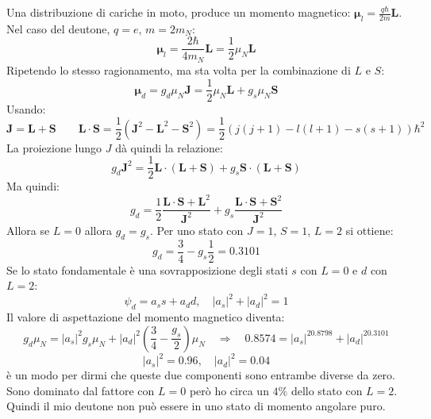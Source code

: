Una distribuzione di cariche in moto, produce un momento magnetico: $\bm{\mu}_l=\frac{q\hbar}{2m}\mathbf{L}$. Nel caso del deutone, $q=e$, $m=2m_N$:
\begin{equation*}
    \bm{\mu}_l=\frac{2\hbar}{4m_N}\mathbf{L}=\frac{1}{2}\mu_N\mathbf{L}
\end{equation*}
Ripetendo lo stesso ragionamento, ma sta volta per la combinazione di $L$ e $S$:
\begin{equation*}
    \bm{\mu}_d=g_d\mu_N\mathbf{J}=\frac{1}{2}\mu_N\mathbf{L}+g_s\mu_N\mathbf{S}
\end{equation*}
Usando:
\begin{equation*}
    \mathbf{J}=\mathbf{L}+\mathbf{S} \qquad \mathbf{L}\cdot\mathbf{S}=\frac{1}{2}\left(\mathbf{J}^2-\mathbf{L}^2-\mathbf{S}^2\right)=\frac{1}{2}(j(j+1)-l(l+1)-s(s+1))\hbar^2
\end{equation*}
La proiezione lungo $J$ dà quindi la relazione:
\begin{equation*}
    g_d\mathbf{J}^2=\frac{1}{2}\mathbf{L}\cdot(\mathbf{L}+\mathbf{S})+g_s\mathbf{S}\cdot(\mathbf{L}+\mathbf{S})
\end{equation*}
Ma quindi:
\begin{equation*}
    g_d=\frac{1}{2}\frac{\mathbf{L}\cdot\mathbf{S}+\mathbf{L}^2}{\mathbf{J}^2}+g_s\frac{\mathbf{L}\cdot\mathbf{S}+\mathbf{S}^2}{\mathbf{J}^2}
\end{equation*}
Allora se $L=0$ allora $g_d=g_s$. Per uno stato con $J=1$, $S=1$, $L=2$ si ottiene:
\begin{equation*}
    g_d=\frac{3}{4}-g_s\frac{1}{2}=0.3101
\end{equation*}
Se lo stato fondamentale è una sovrapposizione degli stati $s$ con $L=0$ e $d$ con $L=2$:
\begin{equation*}
    \psi_d=a_ss+a_dd, \quad |a_s|^2+|a_d|^2=1
\end{equation*}
Il valore di aspettazione del momento magnetico diventa:
\begin{equation*}
    g_d\mu_N=|a_s|^2g_s\mu_N+|a_d|^2\left(\frac{3}{4}-\frac{g_s}{2}\right)\mu_N \quad \Rightarrow\quad 0.8574=|a_s|^20.8798+|a_d|^20.3101
\end{equation*}
\begin{equation*}
    |a_s|^2=0.96 ,\quad |a_d|^2=0.04
\end{equation*}
è un modo per dirmi che queste due componenti sono entrambe diverse da zero. Sono dominato dal fattore con $L=0$ però ho circa un $4\%$ dello stato con $L=2$. Quindi il mio deutone non può essere in uno stato di momento angolare puro.
